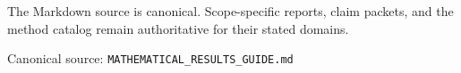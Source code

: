 {\begin{titlepage}
\begin{minipage}{0.86\textwidth}
      \small\color{PidSlate}
      The Markdown source is canonical. Scope-specific reports, claim packets, and the method
      catalog remain authoritative for their stated domains.
    \end{minipage}\par
    \vspace{13mm}
    {\large\color{PidNavy}\@author\hfill\@date\par}
    \vspace{3mm}
    {\small\color{PidSlate}Canonical source: \texttt{MATHEMATICAL\_RESULTS\_GUIDE.md}\par}
    \vspace{8mm}
    \noindent{\color{PidBronze}\rule{\textwidth}{.75pt}}\par
    \vspace{1.4mm}
    \noindent{\color{PidGold}\rule{\textwidth}{.20pt}}\par
  \end{titlepage}
  \hypersetup{pageanchor=true}%
  \setcounter{page}{1}%
  \pagecolor{PidPaper}\color{PidNavy}
}
\makeatother


\AtBeginDocument{}
